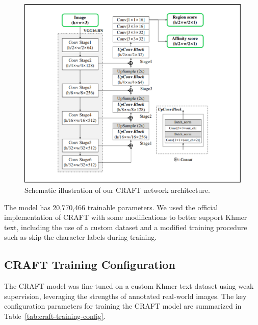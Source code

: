 \begin{figure}[H]
    \centering
    \includegraphics[width=\textwidth]{figures/craft_model.png}
    \caption{Schematic illustration of our CRAFT network architecture.
    \citep{baek2019craft}}
    \label{fig:craft-model}
\end{figure}

The model has 20,770,466 trainable parameters. We used the official 
implementation of CRAFT with some modifications to better support Khmer text,
including the use of a custom dataset and a modified training procedure such as
skip the character labels during training.


\subsection{CRAFT Training Configuration}
\label{subsec:craft-training-config}

The CRAFT model was fine-tuned on a custom Khmer text dataset using weak supervision, leveraging the strengths of annotated real-world images. The key configuration parameters for training the CRAFT model are summarized in Table~\ref{tab:craft-training-config}.

